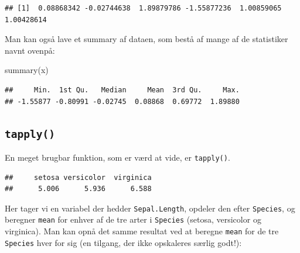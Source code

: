 \documentclass[
]{book}
\newenvironment{Shaded}{\begin{snugshade}}{\end{snugshade}}
\newcommand{\CommentTok}[1]{\textcolor[rgb]{0.56,0.35,0.01}{\textit{#1}}}
\newcommand{\FunctionTok}[1]{\textcolor[rgb]{0.00,0.00,0.00}{#1}}
\newcommand{\NormalTok}[1]{#1}
\newcommand{\SpecialCharTok}[1]{\textcolor[rgb]{0.00,0.00,0.00}{#1}}
\begin{document}
\begin{verbatim}
## [1]  0.08868342 -0.02744638  1.89879786 -1.55877236  1.00859065  1.00428614
\end{verbatim}

Man kan også lave et summary af dataen, som bestå af mange af de statistiker navnt ovenpå:

\begin{Shaded}
\begin{Highlighting}[]
\FunctionTok{summary}\NormalTok{(x)}
\end{Highlighting}
\end{Shaded}

\begin{verbatim}
##     Min.  1st Qu.   Median     Mean  3rd Qu.     Max. 
## -1.55877 -0.80991 -0.02745  0.08868  0.69772  1.89880
\end{verbatim}

\hypertarget{tapply}{%
\subsection{\texorpdfstring{\texttt{tapply()}}{tapply()}}\label{tapply}}

En meget brugbar funktion, som er værd at vide, er \texttt{tapply()}.

\begin{Shaded}
\end{Shaded}

\begin{verbatim}
##     setosa versicolor  virginica 
##      5.006      5.936      6.588
\end{verbatim}

Her tager vi en variabel der hedder \texttt{Sepal.Length}, opdeler den efter \texttt{Species}, og beregner \texttt{mean} for enhver af de tre arter i \texttt{Species} (setosa, versicolor og virginica). Man kan opnå det samme resultat ved at beregne \texttt{mean} for de tre \texttt{Species} hver for sig (en tilgang, der ikke opskaleres særlig godt!):
\end{document}
